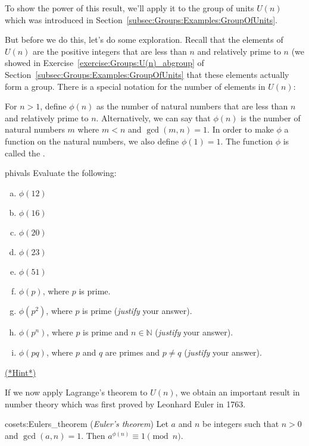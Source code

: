 To show the power of this result, we'll apply it to  the group of units $U(n)$ which was introduced in 
Section~\ref{subsec:Groups:Examples:GroupOfUnits}.

But before we do this, let's do some exploration. Recall that the elements of $U(n)$ are the positive integers that are less than $n$ and relatively prime to $n$ (we showed in Exercise~\ref{exercise:Groups:U(n)_abgroup} of Section~\ref{subsec:Groups:Examples:GroupOfUnits} that these elements actually form a group. There is a special notation for the number of elements in $U(n)$:

\begin{defn}
For $n>1$, define $\phi(n)$ as the number of natural numbers that are less than $n$ and relatively prime to $n$. Alternatively, we can say that  $\phi(n)$ is the number of natural numbers $m$ where  $m < n$ and $\gcd(m,n) = 1$. In order to make $\phi$ a function on the natural numbers, we also define $\phi(1)=1$. 
The function $\phi$ is called the .
\end{defn}


\begin{exercise}{phivals}
Evaluate the following:
\begin{multicols}{2}
\begin{enumerate}[(a)]
\item
$\phi(12)$
\item
$\phi(16)$
\item
$\phi(20)$
\item
$\phi(23)$
\item
$\phi(51)$
\item
$\phi(p)$, where $p$ is prime.
\item\label{p2}
$\phi(p^2)$, where $p$ is prime (\emph{justify} your answer).
\item
$\phi(p^n)$, where $p$ is prime and $n \in {\mathbb N}$ (\emph{justify} your answer).
\item
$\phi(pq)$, where $p$ and $q$ are primes and $p \neq q$ (\emph{justify} your answer).
\end{enumerate}
\end{multicols}
\noindent
\hyperref[sec:Cosets:Hints]{(*Hint*)}
\end{exercise}


If we now apply Lagrange's theorem to $U(n)$, we obtain an important result in number theory which was first proved by Leonhard Euler in 1763. 

\begin{prop}{cosets:Eulers_theorem} (\emph{Euler's theorem}) 
Let $a$ and $n$ be integers such that $n>0$ and $\gcd(a, n) = 1$.  Then $a^{\phi(n)} \equiv 1 \pmod{n}$.
\end{prop}

